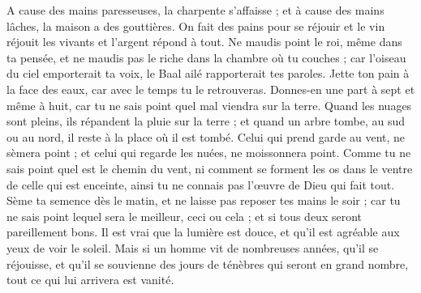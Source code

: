 \begin{multicols}{2}
A cause des mains paresseuses, la charpente s'affaisse ; et à cause des mains lâches, la maison a des gouttières.
On fait des pains pour se réjouir et le vin réjouit les vivants et l'argent répond à tout.
Ne maudis point le roi, même dans ta pensée, et ne maudis pas le riche dans la chambre où tu couches ; car l'oiseau du ciel emporterait ta voix, le Baal ailé rapporterait tes paroles.
\VerseOne{}Jette ton pain à la face des eaux, car avec le temps tu le retrouveras.
Donnes-en une part à sept et même à huit, car tu ne sais point quel mal viendra sur la terre.
Quand les nuages sont pleins, ils répandent la pluie sur la terre ; et quand un arbre tombe, au sud ou au nord, il reste à la place où il est tombé.
Celui qui prend garde au vent, ne sèmera point ; et celui qui regarde les nuées, ne moissonnera point. 
Comme tu ne sais point quel est le chemin du vent, ni comment se forment les os dans le ventre de celle qui est enceinte, ainsi tu ne connais pas l'œuvre de Dieu qui fait tout.
 Sème ta semence dès le matin, et ne laisse pas reposer tes mains le soir ; car tu ne sais point lequel sera le meilleur, ceci ou cela ; et si tous deux seront pareillement bons.
Il est vrai que la lumière est douce, et qu'il est agréable aux yeux de voir le soleil.
Mais si un homme vit de nombreuses années, qu'il se réjouisse, et qu'il se souvienne des jours de ténèbres qui seront en grand nombre, tout ce qui lui arrivera est vanité.

\end{multicols}
